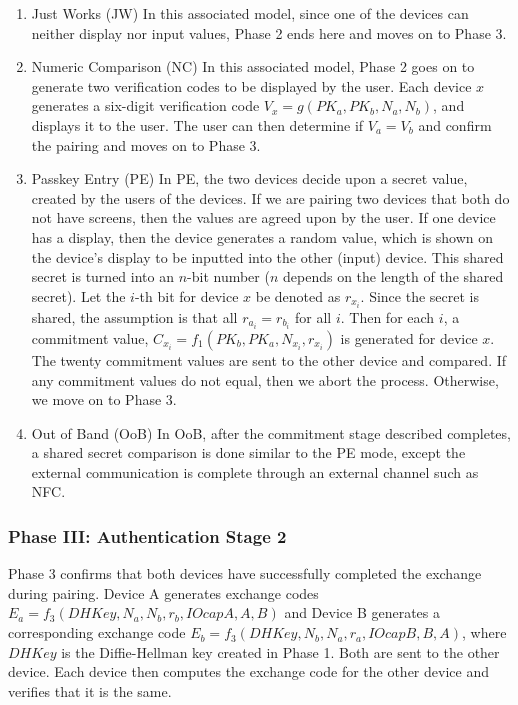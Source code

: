 \documentclass{acm_proc_article-sp}
\begin{document}
\begin{enumerate}[1.]
    \item{Just Works (JW)} In this associated model, since one of the devices can neither display nor input values, Phase 2 ends here and moves on to Phase 3.
    \item{Numeric Comparison (NC)} In this associated model, Phase 2 goes on to generate two verification codes to be displayed by the user. Each device $x$ generates a six-digit verification code $V_x = g(PK_a, PK_b, N_a, N_b)$, and displays it to the user. The user can then determine if $V_a = V_b$ and confirm the pairing and moves on to Phase 3.
    \item{Passkey Entry (PE)} In PE, the two devices decide upon a secret value, created by the users of the devices. If we are pairing two devices that both do not have screens, then the values are agreed upon by the user. If one device has a display, then the device generates a random value, which is shown on the device's display to be inputted into the other (input) device. This shared secret is turned into an $n$-bit number ($n$ depends on the length of the shared secret). Let the $i$-th bit for device $x$ be denoted as $r_{x_i}$. Since the secret is shared, the assumption is that all $r_{a_i} = r_{b_i}$ for all $i$. Then for each $i$, a commitment value, $C_{x_i} = f_1(PK_b, PK_a, N_{x_i}, r_{x_i})$ is generated for device $x$. The twenty commitment values are sent to the other device and compared. If any commitment values do not equal, then we abort the process. Otherwise, we move on to Phase 3.
    \item{Out of Band (OoB)} In OoB, after the commitment stage described completes, a shared secret comparison is done similar to the PE mode, except the external communication is complete through an external channel such as NFC.
\end{enumerate}

\subsubsection{Phase III: Authentication Stage 2}
Phase 3 confirms that both devices have successfully completed the exchange during pairing. Device A generates exchange codes $E_a = f_3(DHKey, N_a, N_b, r_b, IOcapA, A, B)$ and Device B generates a corresponding exchange code $E_b = f_3(DHKey, N_b, N_a, r_a, IOcapB, B, A)$, where $DHKey$ is the Diffie-Hellman key created in Phase 1. Both are sent to the other device. Each device then computes the exchange code for the other device and verifies that it is the same.
\end{document}
